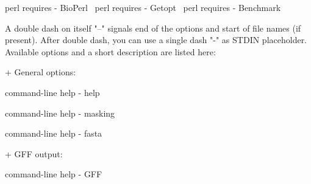 \documentclass[11pt]{article}
\def\nwendcode{\endtrivlist \endgroup} %
\let\nwdocspar=\par                    %
\begin{document}
  \LA{}perl requires - BioPerl~{\nwtagstyle{}}\RA{}
  \LA{}perl requires - Getopt~{\nwtagstyle{}}\RA{}
  \LA{}perl requires - Benchmark~{\nwtagstyle{}}\RA{}
\nwendcode{}%

\nwenddocs{}\endmoddef
A double dash on itself "--" signals end of the options
and start of file names (if present). After double dash,
you can use a single dash "-" as STDIN placeholder. 
Available options and a short description are listed here:

+ General options:

  \LA{}command-line help - help~{\nwtagstyle{}}\RA{}

  \LA{}command-line help - masking~{\nwtagstyle{}}\RA{}

  \LA{}command-line help - fasta~{\nwtagstyle{}}\RA{}

+ GFF output:

  \LA{}command-line help - GFF~{\nwtagstyle{}}\RA{}
\nwendcode{}\nwdocspar

\end{document}
